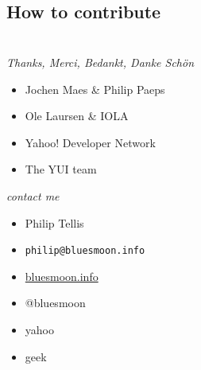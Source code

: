 \documentclass{beamer}
\begin{document}

\subsection{How to contribute}

\section{}
\begin{frame}{\textit{Thanks, Merci, Bedankt, Danke Sch\"on}}
  \begin{itemize}
  \item Jochen Maes \& Philip Paeps
  \item Ole Laursen \& IOLA
  \item Yahoo! Developer Network
  \item The YUI team
  \end{itemize}
\end{frame}

\begin{frame}{\textit{contact me}}
  \begin{itemize}
  \item Philip Tellis
  \item \small{\texttt{philip@bluesmoon.info}}
  \item \href{http://bluesmoon.info/}{bluesmoon.info}
  \item @bluesmoon
  \item yahoo
  \item geek
  \end{itemize}
\end{frame}
\end{document}
